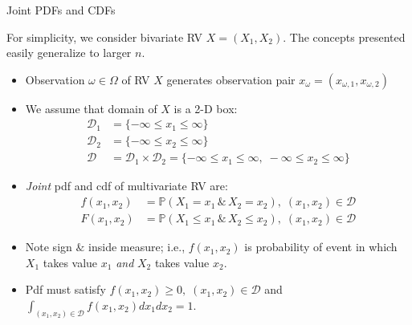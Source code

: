 \documentclass[handout,9pt]{beamer}
\begin{document}
%
\begin{frame}{Joint PDFs and CDFs}

For simplicity, we consider bivariate RV $X=(X_1,X_2)$. The concepts presented easily generalize to larger $n$.

\begin{itemize}
\setlength{\itemsep}{10pt}
\item Observation $\omega \in \Omega$ of RV $X$ generates observation pair $x_\omega=(x_{\omega,1},x_{\omega,2})$ 

\item We assume that domain of $X$ is a 2-D box: 
\begin{align*}
\mathcal{D}_1&=\{-\infty \leq x_1\leq \infty\}\\
\mathcal{D}_2&=\{-\infty \leq x_2\leq \infty\}\\
\mathcal{D}&=\mathcal{D}_1\times \mathcal{D}_2=\{-\infty \leq x_1\leq \infty,\;  -\infty \leq x_2\leq \infty\}
\end{align*}

\item {\em Joint} pdf and cdf of multivariate RV are:
\begin{align*}
f(x_1,x_2)&=\mathbb{P}(X_1=x_1\,\&\, X_2=x_2),\; (x_1,x_2)\in\mathcal{D}\\
F(x_1,x_2)&=\mathbb{P}(X_1\leq x_1\,\&\, X_2\leq x_2),\; (x_1,x_2)\in\mathcal{D}
\end{align*}
\item Note sign $\&$ inside measure; i.e., $f(x_1,x_2)$ is probability of event in which $X_1$ takes value  $x_1$ {\em and} $X_2$ takes value $x_2$.  

\item Pdf must satisfy $f(x_1,x_2)\geq 0,\; (x_1,x_2)\in \mathcal{D}$ and $\int_{(x_1,x_2)\in \mathcal{D}}f(x_1,x_2)dx_1dx_2=1$.

\end{itemize}


\end{frame}
\end{document}
